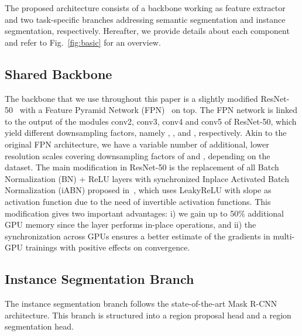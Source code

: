 \documentclass[10pt,twocolumn,letterpaper]{article}
\newcommand{\siABN}{\textrm{iABN}\xspace}
\begin{document}
The proposed architecture consists of a backbone working as feature extractor and two task-specific branches addressing semantic segmentation and instance segmentation, respectively. Hereafter, we provide details about each component and refer to Fig.~\ref{fig:basic} for an overview.

\subsection{Shared Backbone}
The backbone that we use throughout this paper is a slightly modified ResNet-50~\cite{He+16} with a Feature Pyramid Network (FPN)~\cite{Lin2016} on top. 
The FPN network is linked to the output of the modules conv2, conv3, conv4 and conv5 of ResNet-50, which yield different downsampling factors, namely , ,  and , respectively.
Akin to the original FPN architecture, we have a variable number of additional, lower resolution scales covering downsampling factors of  and , depending on the dataset.
The main modification in ResNet-50 is the replacement of all Batch Normalization (BN) + ReLU layers with synchronized Inplace Activated Batch Normalization (\siABN) proposed in~\cite{RotPorKon18a}, which uses LeakyReLU with slope  as activation function due to the need of invertible activation functions. 
This modification gives two important advantages: i) we gain up to 50\% additional GPU memory since the layer performs in-place operations, and ii) the synchronization across GPUs ensures a better estimate of the gradients in multi-GPU trainings with positive effects on convergence.


\subsection{Instance Segmentation Branch}
\label{sec:msk}
The instance segmentation branch follows the state-of-the-art Mask R-CNN~\cite{He2017} architecture.
This branch is structured into a region proposal head and a region segmentation head.
\end{document}
